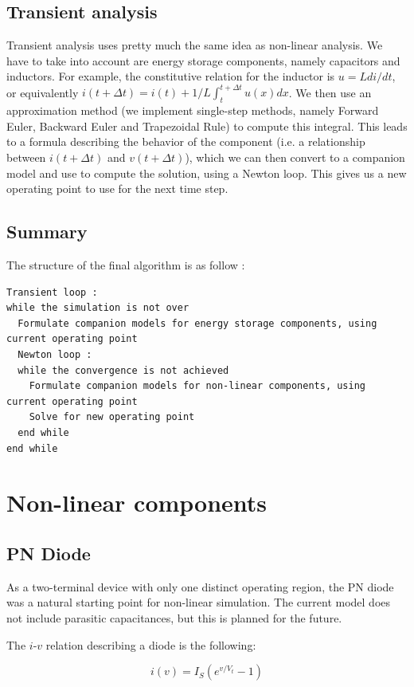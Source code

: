 \documentclass{article}
\begin{document}
\subsection{Transient analysis}
Transient analysis uses pretty much the same idea as non-linear analysis. We have to take into account are energy storage components, namely capacitors and inductors. For example, the constitutive relation for the inductor is $u = L di/dt$, or equivalently $i(t+\Delta t) = i(t) + 1/L \int_t^{t+\Delta t} u(x) dx$. We then use an approximation method (we implement single-step methods, namely Forward Euler, Backward Euler and Trapezoidal Rule) to compute this integral. This leads to a formula describing the behavior of the component (i.e. a relationship between $i(t+\Delta t)$ and $v(t+\Delta t)$), which we can then convert to a companion model and use to compute the solution, using a Newton loop. This gives us a new operating point to use for the next time step.
\subsection{Summary}
The structure of the final algorithm is as follow :
\begin{lstlisting}
Transient loop :
while the simulation is not over
  Formulate companion models for energy storage components, using current operating point
  Newton loop :
  while the convergence is not achieved
    Formulate companion models for non-linear components, using current operating point
    Solve for new operating point
  end while
end while
\end{lstlisting}
\section{Non-linear components}
\subsection{PN Diode}

As a two-terminal device with only one distinct operating region, the PN diode was a natural starting point for non-linear simulation.  The current model does not include parasitic capacitances, but this is planned for the future.

The $i$-$v$ relation describing a diode is the following:

\begin{equation}
i(v) = I_S(e^{v/V_t}-1)
\end{equation}
\end{document}
